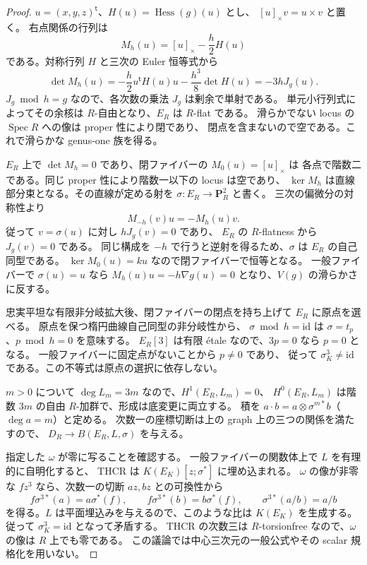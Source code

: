\begin{proof}
$u=(x,y,z)^{\mathsf t}$、$H(u)=\operatorname{Hess}(g)(u)$ とし、
$[u]_\times v=u\times v$ と置く。
右点関係の行列は
\[
 M_h(u)=[u]_\times-\frac h2H(u)
\]
である。対称行列 $H$ と三次の Euler 恒等式から
\begin{equation}\label{eq:nfm-active-point-matrix-determinant}
 \det M_h(u)=-\frac h2u^{\mathsf t}H(u)u
               -\frac{h^3}{8}\det H(u)=-3hJ_g(u).
\end{equation}
$J_g\bmod h=g$ なので、各次数の乗法 $J_g$ は剰余で単射である。
単元小行列式によってその余核は $R$-自由となり、$E_R$ は $R$-flat である。
滑らかでない locus の $\operatorname{Spec}R$ への像は proper 性により閉であり、
閉点を含まないので空である。これで滑らかな genus-one 族を得る。

$E_R$ 上で $\det M_h=0$ であり、閉ファイバーの $M_0(u)=[u]_\times$ は
各点で階数二である。同じ proper 性により階数一以下の locus は空であり、
$\ker M_h$ は直線部分束となる。その直線が定める射を
$\sigma:E_R\to\mathbf P^2_R$ と書く。
三次の偏微分の対称性より
\[
 M_{-h}(v)u=-M_h(u)v.
\]
従って $v=\sigma(u)$ に対し $hJ_g(v)=0$ であり、
$E_R$ の $R$-flatness から $J_g(v)=0$ である。
同じ構成を $-h$ で行うと逆射を得るため、$\sigma$ は $E_R$ の自己同型である。
$\ker M_0(u)=ku$ なので閉ファイバーで恒等となる。
一般ファイバーで $\sigma(u)=u$ なら
$M_h(u)u=-h\nabla g(u)=0$ となり、$V(g)$ の滑らかさに反する。

忠実平坦な有限非分岐拡大後、閉ファイバーの閉点を持ち上げて $E_R$ に原点を選べる。
原点を保つ楕円曲線自己同型の非分岐性から、
$\sigma\bmod h=\mathrm{id}$ は $\sigma=t_p$、$p\bmod h=0$ を意味する。
$E_R[3]$ は有限 \'etale なので、$3p=0$ なら $p=0$ となる。
一般ファイバーに固定点がないことから $p\ne0$ であり、
従って $\sigma_K^3\ne\mathrm{id}$ である。この不等式は原点の選択に依存しない。

$m>0$ について $\deg L_m=3m$ なので、$H^1(E_R,L_m)=0$、
$H^0(E_R,L_m)$ は階数 $3m$ の自由 $R$-加群で、形成は底変更に両立する。
積を $a\cdot b=a\otimes\sigma^{m*}b$（$\deg a=m$）と定める。
次数一の座標切断は上の graph 上の三つの関係を満たすので、
$D_R\to B(E_R,L,\sigma)$ を与える。

指定した $\omega$ が零に写ることを確認する。
一般ファイバーの関数体上で $L$ を有理的に自明化すると、
THCR は $K(E_K)[z;\sigma^*]$ に埋め込まれる。
$\omega$ の像が非零な $fz^3$ なら、次数一の切断 $az,bz$ との可換性から
\[
 f\sigma^{3*}(a)=a\sigma^*(f),\qquad
 f\sigma^{3*}(b)=b\sigma^*(f),\qquad
 \sigma^{3*}(a/b)=a/b
\]
を得る。$L$ は平面埋込みを与えるので、このような比は $K(E_K)$ を生成する。
従って $\sigma_K^3=\mathrm{id}$ となって矛盾する。
THCR の次数三は $R$-torsionfree なので、$\omega$ の像は $R$ 上でも零である。
この議論では中心三次元の一般公式やその scalar 規格化を用いない。


\end{proof}
